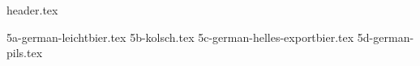 \clearpage
{}
\divisorLine
{header.tex}
\begin{multicols}{2}
{5a-german-leichtbier.tex}
{5b-kolsch.tex}
{5c-german-helles-exportbier.tex}
{5d-german-pils.tex}
\end{multicols}
